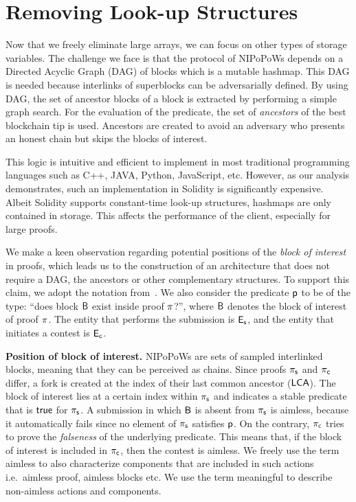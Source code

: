 \section{Removing Look-up Structures}

Now that we freely eliminate large arrays, we can focus on other
types of storage variables. The challenge we face is that the protocol of
NIPoPoWs depends on a Directed Acyclic Graph (DAG) of blocks which is a
mutable hashmap. This DAG is needed because interlinks of superblocks can be
adversarially defined. By using DAG, the set of ancestor blocks of a block is
extracted by performing a simple graph search. For the evaluation of the
predicate, the set of \emph{ancestors} of the best blockchain tip is used.
Ancestors are created to avoid an adversary who presents an honest chain but
skips the blocks of interest.

This logic is intuitive and efficient to implement in most traditional
programming languages such as C++, JAVA, Python, JavaScript, etc. However, as
our analysis demonstrates, such an implementation in Solidity is significantly
expensive. Albeit Solidity supports constant-time look-up structures, hashmaps
are only contained in storage. This affects the performance of the client,
especially for large proofs.

We make a keen observation regarding potential positions of the \emph{block of
interest} in proofs, which leads us to the construction of an architecture that
does not require a DAG, the ancestors or other complementary structures. To
support this claim, we adopt the notation from~\cite{nipopows}. We also
consider the predicate $\mathsf{p}$ to be of the type: ``does block $\mathsf{B}$ exist
inside proof $\mathsf{\pi}$?'', where $\mathsf{B}$ denotes the block of interest of proof
$\mathsf{\pi}$. The entity that performs the submission is $\mathsf{E_{s}}$, and the entity that
initiates a contest is $\mathsf{E_{c}}$.

\noindent \textbf{Position of block of interest.} NIPoPoWs are sets of sampled
interlinked blocks, meaning that they can be perceived as chains. Since proofs
$\mathsf{\pi_{s}}$ and $\mathsf{\pi_{c}}$ differ, a fork is created at the index of
their last common ancestor ($\mathsf{LCA}$). The block of interest lies at a certain
index within $\mathsf{\pi_{s}}$ and indicates a stable predicate~\cite{nipopows,
generic-client} that is $\textsf{true}$ for $\mathsf{\pi_{s}}$. A submission in which $\mathsf{B}$ is
absent from $\mathsf{\pi_{s}}$ is aimless, because it automatically fails since no element
of $\mathsf{\pi_{s}}$ satisfies $\mathsf{p}$. On the contrary, $\mathsf{\pi_{c}}$ tries to prove the
\emph{falseness} of the underlying predicate. This means that, if the block of
interest is included in $\mathsf{\pi_{c}}$, then the contest is aimless. We freely use the
term aimless to also characterize components that are included in such actions
i.e.\ aimless proof, aimless blocks etc. We use the term meaningful to describe
non-aimless actions and components.

